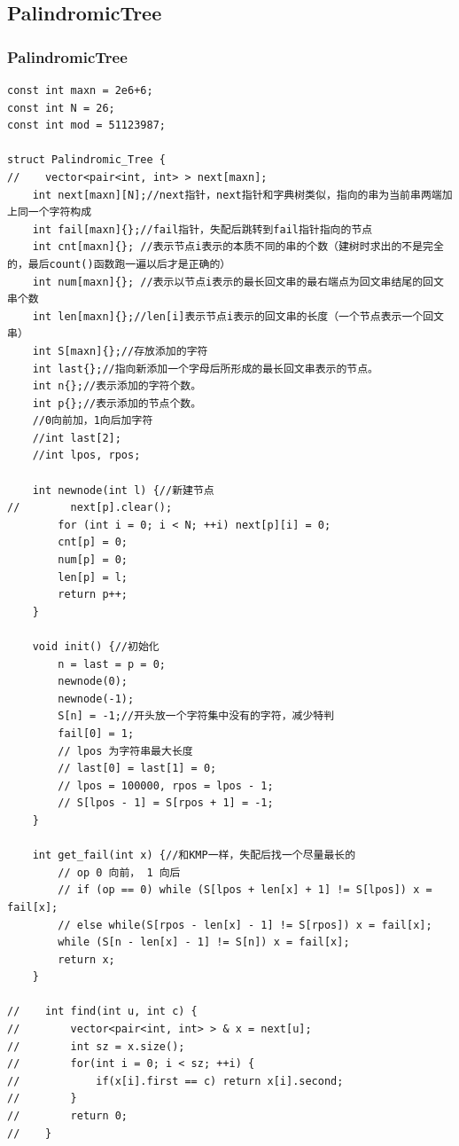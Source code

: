 \documentclass[twoside]{article}
\begin{document}
\subsection{PalindromicTree}
\subsubsection{PalindromicTree}
\begin{lstlisting}
const int maxn = 2e6+6;
const int N = 26;
const int mod = 51123987;

struct Palindromic_Tree {
//    vector<pair<int, int> > next[maxn];
    int next[maxn][N];//next指针，next指针和字典树类似，指向的串为当前串两端加上同一个字符构成
    int fail[maxn]{};//fail指针，失配后跳转到fail指针指向的节点
    int cnt[maxn]{}; //表示节点i表示的本质不同的串的个数（建树时求出的不是完全的，最后count()函数跑一遍以后才是正确的）
    int num[maxn]{}; //表示以节点i表示的最长回文串的最右端点为回文串结尾的回文串个数
    int len[maxn]{};//len[i]表示节点i表示的回文串的长度（一个节点表示一个回文串）
    int S[maxn]{};//存放添加的字符
    int last{};//指向新添加一个字母后所形成的最长回文串表示的节点。
    int n{};//表示添加的字符个数。
    int p{};//表示添加的节点个数。
    //0向前加，1向后加字符
    //int last[2];
    //int lpos, rpos;

    int newnode(int l) {//新建节点
//        next[p].clear();
        for (int i = 0; i < N; ++i) next[p][i] = 0;
        cnt[p] = 0;
        num[p] = 0;
        len[p] = l;
        return p++;
    }

    void init() {//初始化
        n = last = p = 0;
        newnode(0);
        newnode(-1);
        S[n] = -1;//开头放一个字符集中没有的字符，减少特判
        fail[0] = 1;
        // lpos 为字符串最大长度
        // last[0] = last[1] = 0;
        // lpos = 100000, rpos = lpos - 1;
        // S[lpos - 1] = S[rpos + 1] = -1;
    }

    int get_fail(int x) {//和KMP一样，失配后找一个尽量最长的
        // op 0 向前， 1 向后
        // if (op == 0) while (S[lpos + len[x] + 1] != S[lpos]) x = fail[x];
        // else while(S[rpos - len[x] - 1] != S[rpos]) x = fail[x];
        while (S[n - len[x] - 1] != S[n]) x = fail[x];
        return x;
    }

//    int find(int u, int c) {
//        vector<pair<int, int> > & x = next[u];
//        int sz = x.size();
//        for(int i = 0; i < sz; ++i) {
//            if(x[i].first == c) return x[i].second;
//        }
//        return 0;
//    }


\end{lstlisting}
\end{document}
